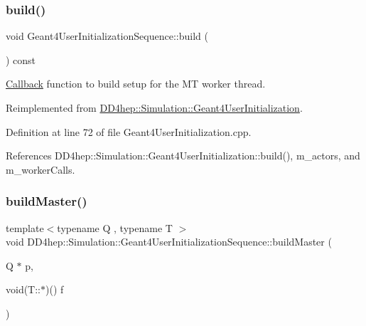 \subsubsection{\texorpdfstring{build()}{build()}\hspace{0.1cm}{\footnotesize\ttfamily [2/2]}}
{\footnotesize\ttfamily void Geant4\+User\+Initialization\+Sequence\+::build (\begin{DoxyParamCaption}{ }\end{DoxyParamCaption}) const\hspace{0.3cm}{\ttfamily [virtual]}}



\hyperlink{class_d_d4hep_1_1_callback}{Callback} function to build setup for the MT worker thread. 



Reimplemented from \hyperlink{class_d_d4hep_1_1_simulation_1_1_geant4_user_initialization_a468385a353537baf52b1dbbcf6453010}{D\+D4hep\+::\+Simulation\+::\+Geant4\+User\+Initialization}.



Definition at line 72 of file Geant4\+User\+Initialization.\+cpp.



References D\+D4hep\+::\+Simulation\+::\+Geant4\+User\+Initialization\+::build(), m\+\_\+actors, and m\+\_\+worker\+Calls.

\hypertarget{class_d_d4hep_1_1_simulation_1_1_geant4_user_initialization_sequence_a8b77abdff57e230fd1a5887c360c078c}{}\label{class_d_d4hep_1_1_simulation_1_1_geant4_user_initialization_sequence_a8b77abdff57e230fd1a5887c360c078c} 
\subsubsection{\texorpdfstring{build\+Master()}{buildMaster()}\hspace{0.1cm}{\footnotesize\ttfamily [1/2]}}
{\footnotesize\ttfamily template$<$typename Q , typename T $>$ \\
void D\+D4hep\+::\+Simulation\+::\+Geant4\+User\+Initialization\+Sequence\+::build\+Master (\begin{DoxyParamCaption}\item[{Q $\ast$}]{p,  }\item[{void(T\+::$\ast$)()}]{f }\end{DoxyParamCaption})\hspace{0.3cm}{\ttfamily [inline]}}



